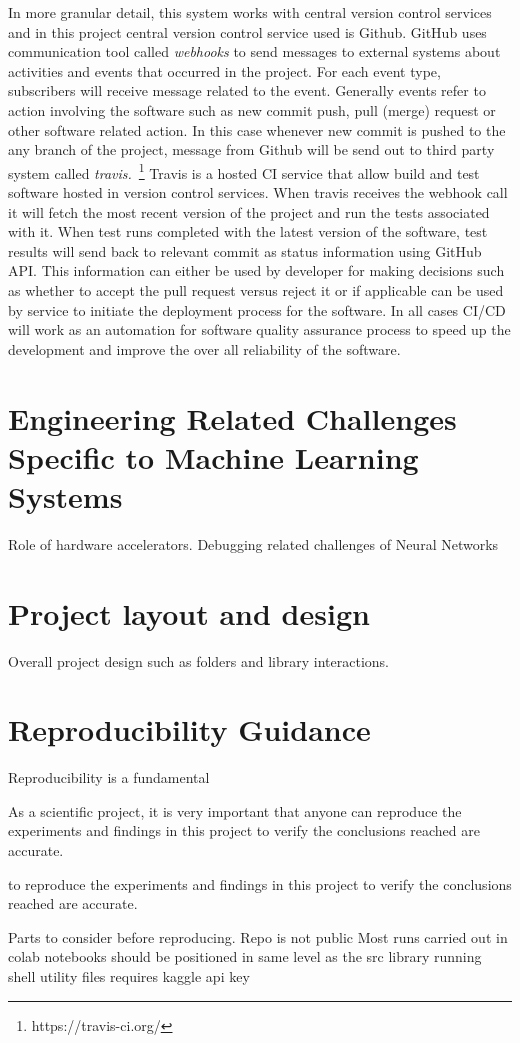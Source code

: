In more granular detail, this system works with central version control services and in this project central version control service used is Github. GitHub uses communication tool called \emph{webhooks} to send messages to external systems about activities and events that occurred in the project. For each event type, subscribers will receive message related to the event. Generally events refer to action involving the software such as new commit push, pull (merge) request or other software related action. In this case whenever new commit is pushed to the any branch of the project, message from Github will be send out to third party system called \emph{travis.}~\footnote{https://travis-ci.org/} Travis is a hosted CI service that allow build and test software hosted in version control services. When travis receives the webhook call it will fetch the most recent version of the project and run the tests associated with it. When test runs completed with the latest version of the software, test results will send back to relevant commit as status information using GitHub API. This information can either be used by developer for making decisions such as whether to accept the pull request versus reject it or if applicable can be used by service to initiate the deployment process for the software. In all cases CI/CD will work as an automation for software quality assurance process to speed up the development and improve the over all reliability of the software.
 

\section{Engineering Related Challenges Specific to Machine Learning Systems} \label{sec:engchallenge}
Role of hardware accelerators. Debugging related challenges of Neural Networks

\section{Project layout and design} \label{sec:projectlayout}
Overall project design such as folders and library interactions.

\section{Reproducibility Guidance} \label{sec:reproducibility}
Reproducibility is a fundamental 

As a scientific project, it is very important that anyone can reproduce the experiments and findings in this project to verify the conclusions reached are accurate. \cite{dataset}


to reproduce the experiments and findings in this project to verify the conclusions reached are accurate.

Parts to consider before reproducing.
Repo is not public
Most runs carried out in colab 
notebooks should be positioned in same level as the src library
running shell utility files requires kaggle api key


\clearpage